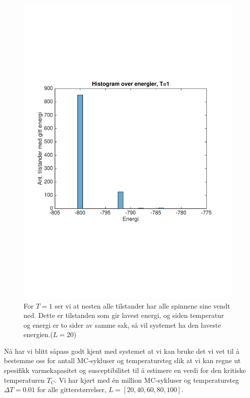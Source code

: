 \documentclass[norsk, 10pt]{article}
\begin{document}
\begin{figure}[H]
	\centering
	\includegraphics[scale = 0.5, trim = 1cm 8cm 1cm 8cm]{histogram_T1_L20.pdf}
	\caption{For $T=1$ ser vi at nesten alle tilstander har alle spinnene sine vendt ned. Dette er tilstanden som gir lavest energi, og siden temperatur og energi er to sider av samme sak, så vil systemet ha den laveste energien.($L=20$)}
	\label{fig:histT1}
\end{figure}

Nå har vi blitt såpass godt kjent med systemet at vi kan bruke det vi vet til å bestemme oss for antall MC-sykluser og temperatursteg slik at vi kan regne ut spesifikk varmekapasitet og  susceptibilitet til å estimere en verdi for den kritiske temperaturen $T_C$. Vi har kjørt med én million MC-sykluser og temperatursteg $\Delta T = 0.01$ for alle gitterstørrelser, $L=[20,40,60,80,100]$.
\end{document}
